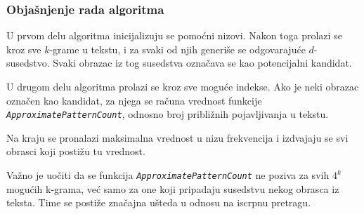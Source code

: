 \documentclass[12pt,oneside]{memoir}
\begin{document}
\begin{algorithm}[h]
\caption{Frequent Words with Mismatches}
\label{alg:frequent_words_with_mismatches}
\SetAlgoLined
\DontPrintSemicolon
{}
\end{algorithm}

\subsubsection{Objašnjenje rada algoritma}

U prvom delu algoritma inicijalizuju se pomoćni nizovi. Nakon toga prolazi se kroz sve $k$-grame u tekstu, i za svaki od njih generiše se odgovarajuće $d$-susedstvo. Svaki obrazac iz tog susedstva označava se kao potencijalni kandidat.

U drugom delu algoritma prolazi se kroz sve moguće indekse. Ako je neki obrazac označen kao kandidat, za njega se računa vrednost funkcije \textit{\texttt{ApproximatePatternCount}}, odnosno broj približnih pojavljivanja u tekstu.

Na kraju se pronalazi maksimalna vrednost u nizu frekvencija i izdvajaju se svi obrasci koji postižu tu vrednost.

Važno je uočiti da se funkcija \textit{\texttt{ApproximatePatternCount}} ne poziva za svih $4^k$ mogućih k-grama, već samo za one koji pripadaju susedstvu nekog obrasca iz teksta. Time se postiže značajna ušteda u odnosu na iscrpnu pretragu.
\end{document}
